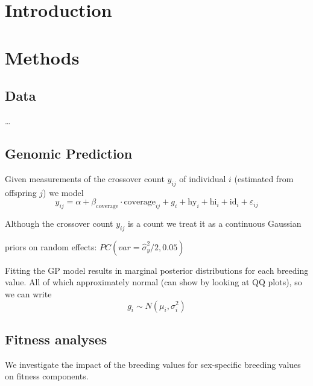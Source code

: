 \documentclass[dvipsnames]{article}
\begin{document}

\maketitle
\newpage

\section*{Introduction}

\section*{Methods}

\subsection*{Data}

…

\subsection*{Genomic Prediction}

Given measurements of the crossover count $y_{ij}$ of individual $i$ (estimated from offspring $j$) we model
\begin{equation*}
    y_{ij} = \alpha + \beta_\text{coverage} \cdot \text{coverage}_{ij} + g_i + \text{hy}_i + \text{hi}_i + \text{id}_i + \varepsilon_{ij}
\end{equation*}

Although the crossover count $y_{ij}$ is a count we treat it as a continuous Gaussian

priors on random effects: $PC(var = \hat{\sigma}^2_y / 2, 0.05)$ 

Fitting the GP model results in marginal posterior distributions for each breeding value. All of which approximately normal (can show by looking at QQ plots), so we can write
\begin{equation*}
    g_i \sim N(\mu_i, \sigma_i^2)
\end{equation*}

\subsection*{Fitness analyses}

We investigate the impact of the breeding values for sex-specific breeding values on fitness components.
\end{document}
